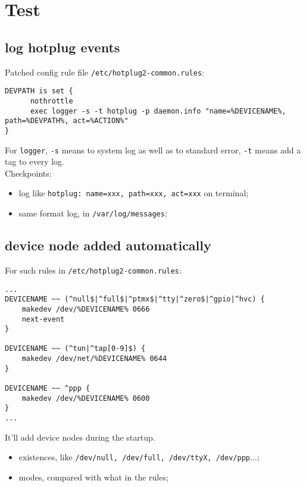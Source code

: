 \documentclass[a4paper]{report}
\begin{document}
\section{Test}
\subsection{log hotplug events}
Patched config rule file {\tt /etc/hotplug2-common.rules}:
\begin{lstlisting}
DEVPATH is set {
      nothrottle
      exec logger -s -t hotplug -p daemon.info "name=%DEVICENAME%, path=%DEVPATH%, act=%ACTION%"
}
\end{lstlisting}
For {\tt logger}, {\tt -s} means to system log as well as to standard error, {\tt -t}
means add a tag to every log.\\
Checkpoints:
\begin{itemize}
    \item log like {\tt hotplug: name=xxx, path=xxx, act=xxx} on terminal;
    \item same format log, in {\tt /var/log/messages};
\end{itemize}
\subsection{device node added automatically}
For such rules in {\tt /etc/hotplug2-common.rules}:
\begin{lstlisting}
...
DEVICENAME ~~ (^null$|^full$|^ptmx$|^tty|^zero$|^gpio|^hvc) {
	makedev /dev/%DEVICENAME% 0666
	next-event
}

DEVICENAME ~~ (^tun|^tap[0-9]$) {
	makedev /dev/net/%DEVICENAME% 0644
}

DEVICENAME ~~ ^ppp {
	makedev /dev/%DEVICENAME% 0600
}
...
\end{lstlisting}
It'll add device nodes during the startup.
\begin{itemize}
    \item existences, like {\tt /dev/null, /dev/full, /dev/ttyX, /dev/ppp}...;
    \item modes, compared with what in the rules;
\end{itemize}
\end{document}
